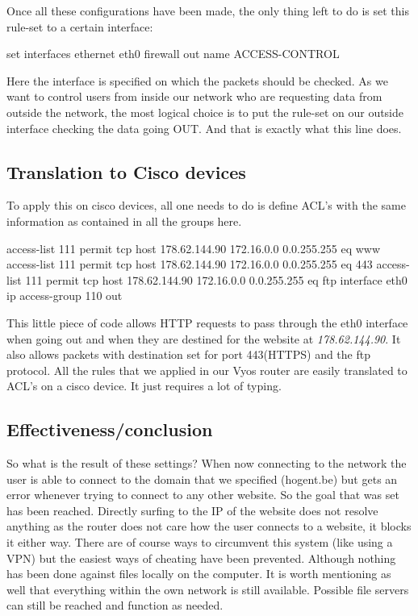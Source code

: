 Once all these configurations have been made, the only thing left to do is set this rule-set to a certain interface:
\begin{cisco}[title=Assigning the rule-set]
set interfaces ethernet eth0 firewall out name ACCESS-CONTROL
\end{cisco}
Here the interface is specified on which the packets should be checked. As we want to control users from inside our network who are requesting data from outside the network, the most logical choice is to put the rule-set on our outside interface checking the data going OUT. And that is exactly what this line does.
\subsection{Translation to Cisco devices}
To apply this on cisco devices, all one needs to do is define ACL's with the same information as contained in all the groups here. 
\begin{cisco}
access-list 111 permit tcp host 178.62.144.90 172.16.0.0 0.0.255.255 eq www
access-list 111 permit tcp host 178.62.144.90 172.16.0.0 0.0.255.255 eq 443
access-list 111 permit tcp host 178.62.144.90 172.16.0.0 0.0.255.255 eq ftp
interface eth0
ip access-group 110 out
\end{cisco}
This little piece of code allows HTTP requests to pass through the eth0 interface when going out and when they are destined for the website at \textit{178.62.144.90}.  It also allows packets with destination set for port 443(HTTPS) and the ftp protocol. All the rules that we applied in our Vyos router are easily translated to ACL's on a cisco device. It just requires a lot of typing.
\subsection{Effectiveness/conclusion}
So what is the result of these settings? When now connecting to the network the user is able to connect to the domain that we specified (hogent.be) but gets an error whenever trying to connect to any other website. So the goal that was set has been reached. Directly surfing to the IP of the website does not resolve anything as the router does not care how the user connects to a website, it blocks it either way. There are of course ways to circumvent this system (like using a VPN) but the easiest ways of cheating have been prevented. Although nothing has been done against files locally on the computer. It is worth mentioning as well that everything within the own network is still available. Possible file servers can still be reached and function as needed.
